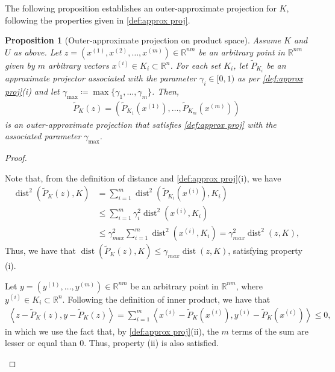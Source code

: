\documentclass[smallextended,numbook,nospthms]{svjour3}
\theoremstyle{plain}
\newtheorem{proposition}[theorem]{Proposition}
\theoremstyle{definition}
\def\RR{\mathds R}
\DeclareMathOperator{\dist}{dist}
\newcommand{\scal}[2]{\left\langle{#1},{#2}  \right\rangle}
\begin{document}
The following proposition establishes an outer-approximate projection for $K$, following the properties given in \cref{def:approx proj}.

\begin{proposition}[Outer-approximate projection on product space]\label{prop:prod space approx proj}
Assume $K$ and $U$ as above. Let $z=\left(x^{(1)}, x^{(2)}, \ldots, x^{(m)}\right) \in \RR^{nm}$ be an arbitrary point in $\RR^{nm}$ given by $m$ arbitrary vectors $x^{(i)} \in K_{i} \subset \RR^{n}$. For each set $K_{i}$, let $\tilde{P}_{K_{i}}$ be an approximate projector associated with the parameter $\gamma_{i} \in [0,1)$ as per \cref{def:approx proj}(i) and let $\gamma_{\max}\coloneqq\max \{\gamma_{1}, \ldots, \gamma_{m}\}$. Then,
\begin{align}\label{eq:PierraP_K}
\tilde{P}_{K}(z)=(\tilde{P}_{K_{1}}  (x^{(1)}), \ldots, \tilde{P}_{K_{m}}(x^{(m)}))    
\end{align}
is an outer-approximate projection that satisfies \cref{def:approx proj} with the associated parameter $\gamma_{\max}$.
\end{proposition}

\begin{proof}
    \begin{listi}
    \item Note that, from the definition of distance and \cref{def:approx proj}(i), we have
    \begin{align}
        \dist^{2}(\tilde{P}_{K}(z), K)
        &= \sum_{i=1}^{m} \dist^{2}(\tilde{P}_{K_{i}}(x^{(i)}), K_{i}) \\
        &\leq \sum_{i=1}^{m} \gamma_{i}^{2}\dist^{2}(x^{(i)}, K_{i}) \\
        &\leq \gamma_{max}^{2} \sum_{i=1}^{m}\dist^{2}(x^{(i)}, K_{i}) = \gamma_{max}^{2} \dist^{2}(z,K),       
    \end{align}
    Thus, we have that $\dist(\tilde{P}_{K}(z), K) \leq \gamma_{max} \dist(z,K)$, satisfying property (i).
    \item Let $y=(y^{(1)},\ldots,y^{(m)}) \in \RR^{nm}$ be an arbitrary point in $\RR^{nm}$, where $y^{(i)} \in K_{i} \subset \RR^{n}$. Following the definition of inner product, we have that
    \begin{align}
        \scal{z-\tilde{P}_{K}(z)}{y-\tilde{P}_{K}(z)}
        = \sum_{i=1}^{m} \scal{x^{\left(i\right)}-\tilde{P}_{K}\left(x^{\left(i\right)}\right)}{y^{\left(i\right)}-\tilde{P}_{K}\left(x^{\left(i\right)}\right)}\leq 0,
    \end{align}
    in which we use the fact that, by \cref{def:approx proj}(ii), the $m$ terms of the sum are lesser or equal than 0. Thus, property (ii) is also satisfied.
    \end{listi}
\end{proof}
\end{document}
